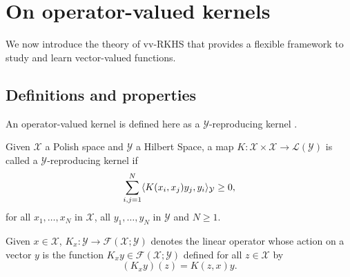\section{On operator-valued kernels}
\label{sec:background_on_operator-valued_kernels}
We now introduce the theory of \acf{vv-RKHS} that provides a flexible framework to study and learn vector-valued functions.
\subsection{Definitions and properties}
\label{subsec:def_properties}
An operator-valued kernel is defined here as a $\mathcal{Y}$-reproducing kernel \citet{Carmeli2010}.
\begin{definition}
\label{def:reproducing_kernel}
Given $\mathcal{X}$ a Polish space and  $\mathcal{Y}$ a Hilbert Space, a map $K:\mathcal{X}\times\mathcal{X}\to\mathcal{L}(\mathcal{Y})$ is called a $\mathcal{Y}$-reproducing kernel if 
\begin{dmath*}
  \sum_{i,j=1}^N\inner{K(x_i,x_j)y_j,y_i}_{\mathcal{Y}}\ge 0,
\end{dmath*} 
for all $x_1,\hdots,x_N$ in $\mathcal{X}$, all $y_1,\hdots,y_N$ in $\mathcal{Y}$ and $N\ge 1$.
 \label{def:ovk}
 \end{definition}
Given $x\in\mathcal{X}$, $K_x:\mathcal{Y}\to\mathcal{F}(\mathcal{X};\mathcal{Y})$ denotes the linear operator whose action on a vector $y$ is the function $K_xy\in\mathcal{F}(\mathcal{X};\mathcal{Y})$ defined for all $z\in\mathcal{X}$ by
\begin{dmath}
\label{eq:trivial_feature_op}
(K_x y)(z)=K(z,x)y.
\end{dmath}
